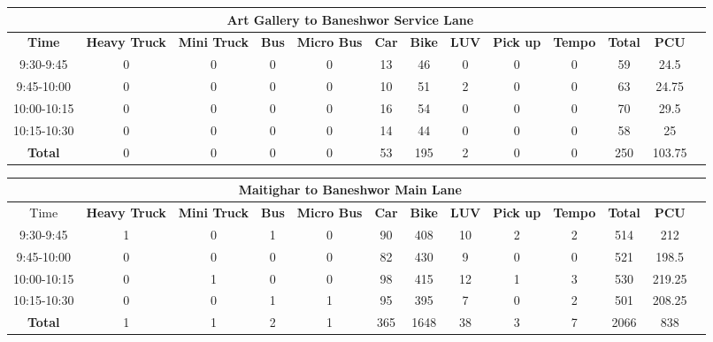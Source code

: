 \begin{landscape}
\centering
\begin{table}[h!]
\centering
\begin{tabular}{|c|c|c|c|c|c|c|c|c|c|c|c|c|}
    \hline
    \multicolumn{12}{|c|}{\textbf{Art Gallery to Baneshwor Service Lane}} \\
    \hline
    \textbf{Time} & \textbf{Heavy Truck} & \textbf{Mini Truck} & \textbf{Bus} & \textbf{Micro Bus} & \textbf{Car} & \textbf{Bike} & \textbf{LUV} & \textbf{Pick up} & \textbf{Tempo} & \textbf{\textbf{Total}} & \textbf{PCU} \\
    \hline
9:30-9:45	&0	&0	&0	&0	&13	&46	&0	&0	&0	&59	&24.5 \\ \hline
9:45-10:00	&0	&0	&0	&0	&10	&51	&2	&0	&0	&63	&24.75 \\ \hline
10:00-10:15	&0	&0	&0	&0	&16	&54	&0	&0	&0	&70	&29.5 \\ \hline
10:15-10:30	&0	&0	&0	&0	&14	&44	&0	&0	&0	&58	&25 \\ \hline
\textbf{Total}	&0	&0	&0	&0	&53	&195	&2	&0	&0	&250	&103.75 \\ \hline

\end{tabular}

\vspace{0.5cm}

\begin{tabular}{|c|c|c|c|c|c|c|c|c|c|c|c|c|}
    \hline
    \multicolumn{12}{|c|}{\textbf{Maitighar to Baneshwor Main Lane}} \\
    \hline
        Time & \textbf{Heavy Truck} & \textbf{Mini Truck} & \textbf{Bus} & \textbf{Micro Bus} & \textbf{Car} & \textbf{Bike} & \textbf{LUV} & \textbf{Pick up} & \textbf{Tempo} & \textbf{\textbf{Total}} & \textbf{PCU} \\
    \hline
9:30-9:45	&1	&0	&1	&0	&90	&408	&10	&2	&2	&514	&212 \\ \hline
9:45-10:00	&0	&0	&0	&0	&82	&430	&9	&0	&0	&521	&198.5 \\ \hline
10:00-10:15	&0	&1	&0	&0	&98	&415	&12	&1	&3	&530	&219.25 \\ \hline
10:15-10:30	&0	&0	&1	&1	&95	&395	&7	&0	&2	&501	&208.25 \\ \hline
\textbf{Total}	&1	&1	&2	&1	&365	&1648	&38	&3	&7	&2066	&838 \\ \hline

\end{tabular}

\vspace{0.5cm}


\end{table}
\end{landscape}
